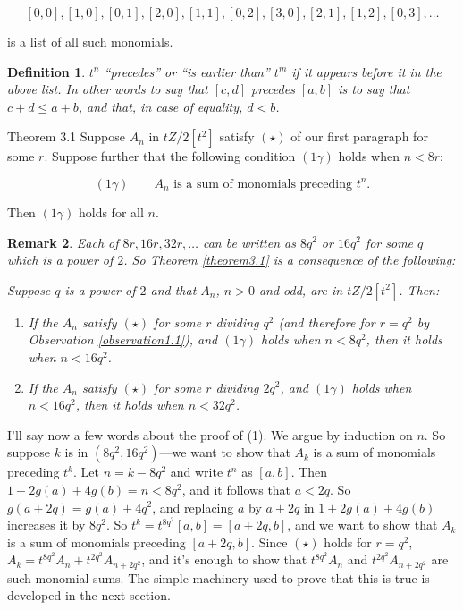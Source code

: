 \documentclass{monsky2009}
\newenvironment{theorem*}[1]{\textbf{#1}\itshape \hspace{.3em}}{\upshape}
\newenvironment{remark*}[1]{\textbf{#1}\itshape \hspace{.3em}}{\upshape}
\newtheorem{definition}{Definition}[section]
\newtheorem{remark}[definition]{Remark}
\begin{document}
\[
[0,0],[1,0],[0,1],[2,0],[1,1],[0,2],[3,0],[2,1],[1,2],[0,3],\ldots
\]

is a list of all such monomials.

\begin{definition}
\label{def1.3}
$t^{n}$ ``precedes'' or ``is earlier than'' $t^{m}$ if it appears before it in the above list. In other words to say that $[c,d]$ precedes $[a,b]$ is to say that $c+d\le a+b$, and that, in case of equality, $d<b$.
\end{definition}

\begin{theorem*}{Theorem 3.1}
\label{theorem3.1prelim}
Suppose $A_{n}$ in $tZ/2[t^{2}]$ satisfy $(\star)$ of our first paragraph for some $r$. Suppose further that the following condition  $(1\gamma)$ holds when $n<8r$:

\[
(1\gamma)\qquad
A_{n}\mbox{ is a sum of monomials preceding }t^{n}.
\]

Then $(1\gamma)$ holds for all $n$.
\end{theorem*}

\begin{remark}
\label{remark1.4}
Each of $8r, 16r, 32r, \ldots$ can be written as $8q^{2}$ or $16q^{2}$ for some $q$ which is a power of $2$. So Theorem \ref{theorem3.1} is a consequence of the following:

Suppose $q$ is a power of $2$ and that $A_{n}$, $n>0$ and odd, are in $tZ/2[t^{2}]$. Then:

\begin{enumerate}
\item[(1)] If the $A_{n}$ satisfy $(\star)$ for some $r$ dividing $q^{2}$ (and therefore for $r=q^{2}$ by Observation \ref{observation1.1}), and $(1\gamma)$ holds when $n<8q^{2}$, then it holds when $n<16q^{2}$.
\item[(2)] If the $A_{n}$ satisfy $(\star)$ for some $r$ dividing $2q^{2}$, and $(1\gamma)$ holds when $n<16q^{2}$, then it holds when $n<32q^{2}$.
\end{enumerate}
\end{remark}

I'll say now a few words about the proof of (1). We argue by induction on $n$. So suppose $k$ is in $(8q^{2},16q^{2})$---we want to show that $A_{k}$ is a sum of monomials preceding $t^{k}$. Let $n=k-8q^{2}$ and write $t^{n}$ as $[a,b]$. Then $1+2g(a)+4g(b)=n<8q^{2}$, and it follows that $a<2q$. So $g(a+2q) = g(a) +4q^{2}$, and replacing $a$ by $a+2q$ in $1+2g(a)+4g(b)$ increases it by $8q^{2}$. So $t^{k} =t^{8q^{2}}[a,b]=[a+2q,b]$, and we want to show that $A_{k}$ is a sum of monomials preceding $[a+2q,b]$. Since $(\star)$ holds for $r=q^{2}$, $A_{k}=t^{8q^{2}}A_{n}+t^{2q^{2}}A_{n+2q^{2}}$, and it's enough to show that $t^{8q^{2}}A_{n}$ and $t^{2q^{2}}A_{n+2q^{2}}$ are such monomial sums. The simple machinery used to prove that this is true is developed in the next section.
\end{document}
